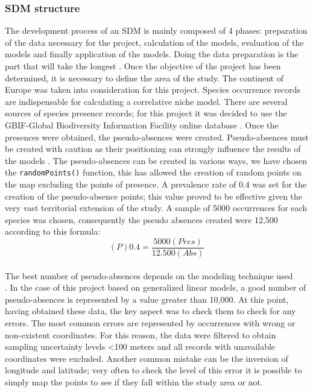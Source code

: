 \documentclass[12pt,a4paper]{article}
\begin{document}
\subsubsection{SDM structure}
The development process of an SDM is mainly composed of 4 phases: preparation of the data necessary for the project, calculation of the models, evaluation of the models and finally application of the models. Doing the data preparation is the part that will take the longest \citep{sil}.
Once the objective of the project has been determined, it is necessary to define the area of the study.
The continent of Europe was taken into consideration for this project.
Species occurrence records are indispensable for calculating a correlative niche model. There are several sources of species presence records; for this project it was decided to use the GBIF-Global Biodiversity Information Facility online database \citep{yes}.
Once the presences were obtained, the pseudo-absences were created.
Pseudo-absences must be created with caution as their positioning can strongly influence the results of the models \citep{mass}.
The pseudo-absences can be created in various ways, we have chosen the \texttt{randomPoints()} function, this has allowed the creation of random points on the map excluding the points of presence.
A prevalence rate of 0.4 was set for the creation of the pseudo-absence points; this value proved to be effective given the very vast territorial extension of the study.
A sample of 5000 occurrences for each species was chosen, consequently the pseudo absences created were 12,500 according to this formula:\\ \[(P)0.4=\frac{5000(Pres)}{12.500 (Abs)}\] \\
The best number of pseudo-absences depends on the modeling technique used\\ \citep{kan} \citep{mass} .
In the case of this project based on generalized linear models, a good number of pseudo-absences is represented by a value greater than 10,000.
At this point, having obtained these data, the key aspect was to check them to check for any errors.
The most common errors are represented by occurrences with wrong or non-existent coordinates.
For this reason, the data were filtered to obtain sampling uncertainty levels <100 meters and all records with unavailable coordinates were excluded.
Another common mistake can be the inversion of longitude and latitude;
very often to check the level of this error it is possible to simply map the points to see if they fall within the study area or not.
\end{document}
